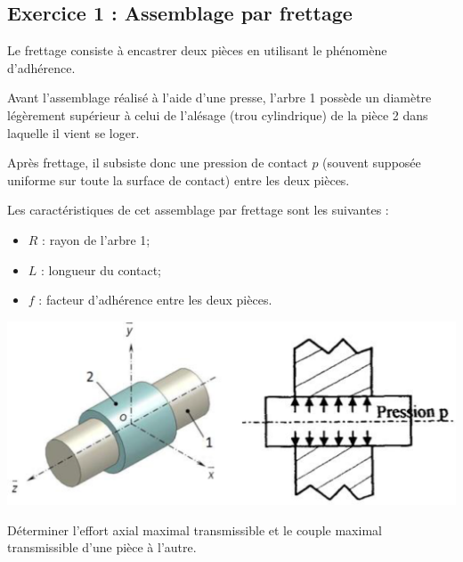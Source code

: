 \documentclass[10pt,fleqn]{article} %
\begin{document}

\vspace{5cm}
\pagestyle{fancy}
\thispagestyle{plain}


\def\columnseprulecolor{\color{ocre}}
\setlength{\columnseprule}{0.4pt} 

\ifprof
\else
\begin{multicols}{2}
\fi

\subsection*{Exercice 1 : Assemblage par frettage}

Le frettage consiste à encastrer deux pièces en utilisant le phénomène d’adhérence. 
 
Avant l’assemblage réalisé à l’aide d’une presse, l’arbre 1 
possède un diamètre légèrement supérieur à celui de l’alésage 
(trou cylindrique) de la pièce 2 dans laquelle il vient se loger. 
 
Après frettage, il subsiste donc une pression de contact $p$ 
(souvent supposée uniforme sur toute la surface de contact) 
entre les deux pièces. 

 
Les caractéristiques de cet assemblage par frettage sont les suivantes : 
\begin{itemize}
\item $R$ : rayon de l’arbre 1;
\item $L$ : longueur du contact; 
\item $f$ : facteur d’adhérence entre les deux pièces.
\end{itemize}



\begin{center}
\includegraphics[width=\linewidth]{images/fig_01}
\end{center}


\begin{obj}
Déterminer l’effort axial maximal transmissible et le couple maximal transmissible d’une pièce à 
l’autre.
\end{obj}


\end{multicols}
\end{document}
